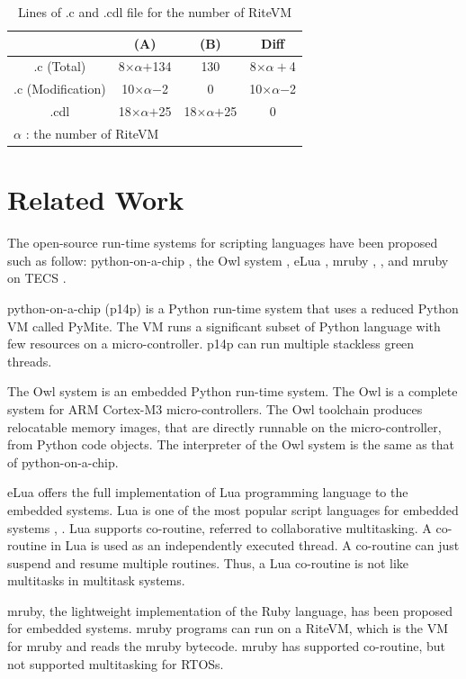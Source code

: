 \documentclass[a4j,12pt,oneside,openany,english]{jsbook}
\begin{document}
\begin{table}[t]
    \centering
    \caption{Lines of .c and .cdl file for the number of RiteVM}
    \begin{tabular}{c||cc|c}
                & (A)       & (B)     & Diff  \\ \hline
        .c (Total)      & 8$\times$$\alpha$$+$134  & 130     & 8$\times$$\alpha+$4\\
        .c (Modification)   & 10$\times\alpha$$-$2 & 0   &  10$\times\alpha$$-$2 \\
        .cdl    & 18$\times$$\alpha$$+$25   & 18$\times$$\alpha$$+$25 & 0     \\
        \multicolumn{3}{l}{{\small $\alpha$} : {\scriptsize the number of RiteVM}}
    \end{tabular}
    \label{tab:codesize}
\end{table}

\chapter{Related Work}
\label{sec:Related work}
The open-source run-time systems for scripting languages have been proposed such as follow:
python-on-a-chip \cite{url:python-on-a-chip}, the Owl system \cite{par:owl}, eLua \cite{url:eLua}, mruby \cite{par:mruby}, \cite{url:mruby}, and mruby on TECS \cite{par:mrubyonTECS}.

python-on-a-chip (p14p) is a Python run-time system that uses a reduced Python VM called PyMite.
The VM runs a significant subset of Python language with few resources on a micro-controller.
p14p can run multiple stackless green threads.

The Owl system is an embedded Python run-time system.
The Owl is a complete system for ARM Cortex-M3 micro-controllers.
The Owl toolchain produces relocatable memory images, that are directly runnable on the micro-controller, from Python code objects.
The interpreter of the Owl system is the same as that of python-on-a-chip.

eLua offers the full implementation of Lua programming language to the embedded systems.
Lua is one of the most popular script languages for embedded systems \cite{url:Lua}, \cite{par:Lua}.
Lua supports co-routine, referred to collaborative multitasking.
A co-routine in Lua is used as an independently executed thread.
A co-routine can just suspend and resume multiple routines.
Thus, a Lua co-routine is not like multitasks in multitask systems.

mruby, the lightweight implementation of the Ruby language, has been proposed for embedded systems.
mruby programs can run on a RiteVM, which is the VM for mruby and reads the mruby bytecode.
mruby has supported co-routine, but not supported multitasking for RTOSs.
\end{document}
